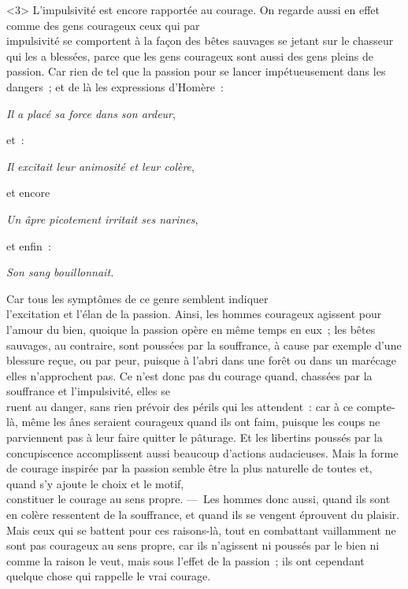 \documentclass[french,twoside]{book} %
\begin{document}
<3> L’impulsivité est encore rapportée au courage. On regarde aussi en effet comme des gens courageux ceux qui par \\
impulsivité se comportent à la façon des bêtes sauvages se jetant sur le chasseur qui les a blessées, parce que les gens courageux sont aussi des gens pleins de passion. Car rien de tel que la passion pour se lancer impétueusement dans les dangers ; et de là les expressions d’Homère :\par
{\itshape Il a placé sa force dans son ardeur}, \par
et :\par
{\itshape Il excitait leur animosité et leur colère}, \par
et encore \par
{\itshape Un âpre picotement irritait ses narines}, \par
et enfin :\par
 {\itshape Son sang bouillonnait.} \par
Car tous les symptômes de ce genre semblent indiquer \\
l’excitation et l’élan de la passion. Ainsi, les hommes courageux agissent pour l’amour du bien, quoique la passion opère en même temps en eux ; les bêtes sauvages, au contraire, sont poussées par la souffrance, à cause par exemple d’une blessure reçue, ou par peur, puisque à l’abri dans une forêt ou dans un marécage elles n’approchent pas. Ce n’est donc pas du courage quand, chassées par la souffrance et l’impulsivité, elles se \\
ruent au danger, sans rien prévoir des périls qui les attendent : car à ce compte-là, même les ânes seraient courageux quand ils  ont faim, puisque les coups ne parviennent pas à leur faire quitter le pâturage. Et les libertins poussés par la concupiscence accomplissent aussi beaucoup d’actions audacieuses. Mais la forme de courage inspirée par la passion semble être la plus naturelle de toutes et, quand s’y ajoute le choix et le motif, \\
constituer le courage au sens propre. — Les hommes donc aussi, quand ils sont en colère ressentent de la souffrance, et quand ils se vengent éprouvent du plaisir. Mais ceux qui se battent pour ces raisons-là, tout en combattant vaillamment ne sont pas courageux au sens propre, car ils n’agissent ni poussés par le bien ni comme la raison le veut, mais sous l’effet de la passion ; ils ont cependant quelque chose qui rappelle le vrai courage.\par
\\
\end{document}

